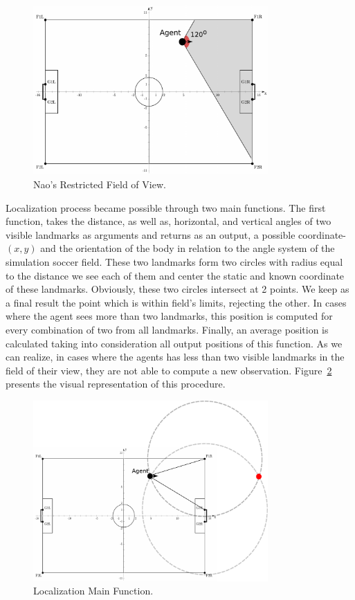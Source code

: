 \begin{figure}[t!]
\centering
  \includegraphics[width=0.8\textwidth]{Chapter3/figures/LViewAngle.pdf}
  \caption{Nao's Restricted Field of View.} 
  \label{fig:fieldofview}
\end{figure}
 
Localization process became possible through two main functions. The first function, takes the distance, as well as, horizontal, and vertical angles of two visible landmarks as arguments and returns as an output, a possible coordinate-$(x,y)$ and the orientation of the body in relation to the angle system of the simulation soccer field. These two landmarks form two circles with radius equal to the distance we see each of them and center the static and known coordinate of these landmarks. Obviously, these two circles intersect at 2 points. We keep as a final result the point which is within field's limits, rejecting the other. In cases where the agent sees more than two landmarks, this position is computed for every combination of two from all landmarks. Finally, an average position is calculated taking into consideration all output positions of this function. As we can realize, in cases where the agents has less than two visible landmarks in the field of their view, they are not able to compute a new observation. Figure~\ref{fig:Localization} presents the visual representation of this procedure. 

\begin{figure}[t!]
\centering
  \includegraphics[width=0.8\textwidth]{Chapter3/figures/Localization.pdf}
  \caption{Localization Main Function.} 
  \label{fig:Localization}
\end{figure}


